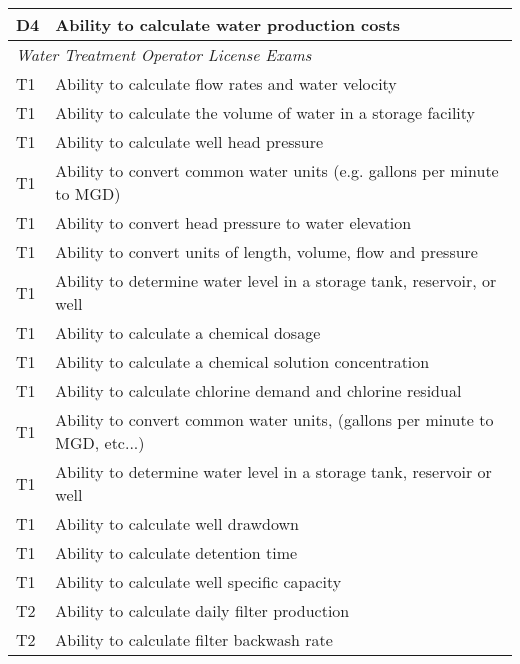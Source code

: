 \begin{table}[H]
\begin{tabular}{| m{1cm} |m{15cm} |}
D4 & Ability to calculate water production costs                                  \\ \hline
\multicolumn{2}{|l|}{\textit{Water   Treatment Operator License Exams}}                                                                  \\ \hline
T1 & Ability to calculate   flow rates and water velocity                         \\ \hline
T1 & Ability to calculate   the volume of water in a storage facility             \\ \hline
T1 & Ability to calculate   well head pressure                                    \\ \hline
T1 & Ability to convert   common water units (e.g. gallons per minute to MGD)     \\ \hline
T1 & Ability to convert   head pressure to water elevation                        \\ \hline
T1 & Ability to convert   units of length, volume, flow and pressure              \\ \hline
T1 & Ability to determine   water level in a storage tank, reservoir, or well     \\ \hline
T1 & Ability to calculate   a chemical dosage                                     \\ \hline
T1 & Ability to calculate   a chemical solution concentration                     \\ \hline
T1 & Ability to calculate   chlorine demand and chlorine residual                 \\ \hline
T1 & Ability to convert   common water units, (gallons per minute to MGD, etc...) \\ \hline
T1 & Ability to determine   water level in a storage tank, reservoir or well      \\ \hline
T1 & Ability to calculate   well drawdown                                                                                              \\ \hline
T1 & Ability to calculate   detention time                                                                                             \\ \hline
T1 & Ability to calculate   well specific capacity                                                                                     \\ \hline
T2 & Ability to calculate   daily filter production                               \\ \hline
T2 & Ability to calculate   filter backwash rate                                  \\ \hline

\end{tabular}
\end{table}
